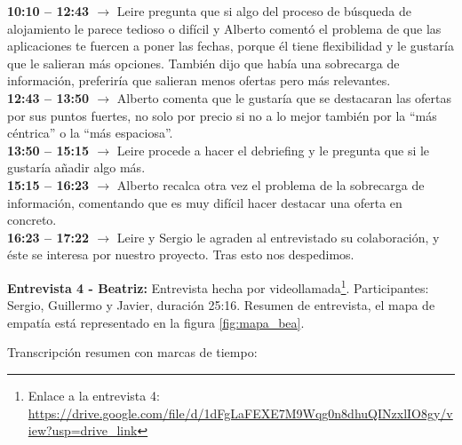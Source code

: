 \textbf{10:10 -- 12:43 $\rightarrow$} Leire pregunta que si algo del proceso de búsqueda de alojamiento le parece tedioso o difícil y Alberto comentó el problema de que 
las aplicaciones te fuercen a poner las fechas, porque él tiene flexibilidad y le gustaría que le salieran más opciones. También dijo que había una 
sobrecarga de información, preferiría que salieran menos ofertas pero más relevantes. \\
\textbf{12:43 -- 13:50 $\rightarrow$} Alberto comenta que le gustaría que se destacaran las ofertas por sus puntos fuertes, no solo por precio si no a 
lo mejor también por la “más céntrica” o la “más espaciosa”. \\
\textbf{13:50 -- 15:15 $\rightarrow$} Leire procede a hacer el debriefing y le pregunta que si le gustaría añadir algo más. \\
\textbf{15:15 -- 16:23 $\rightarrow$} Alberto recalca otra vez el problema de la sobrecarga de información, comentando que es muy difícil hacer destacar una oferta en concreto. \\
\textbf{16:23 -- 17:22 $\rightarrow$} Leire y Sergio le agraden al entrevistado su colaboración, y éste se interesa por nuestro proyecto. Tras esto nos despedimos.

\textbf{Entrevista 4 - Beatriz:} Entrevista hecha por videollamada\footnote{Enlace a la entrevista 4: \url{https://drive.google.com/file/d/1dFgLaFEXE7M9Wqg0n8dhuQINzxlIO8gy/view?usp=drive_link}}. Participantes: Sergio, Guillermo y Javier, duración 25:16.
Resumen de entrevista, el mapa de empatía está representado en la figura \ref{fig:mapa_bea}.



Transcripción resumen con marcas de tiempo:

